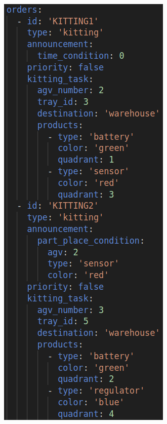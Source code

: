 \documentclass{uva-inf-article}
\begin{document}
\begin{figure}[h]
\includegraphics[scale=0.32]{images/rwa67_trial_3.png}

\end{figure}
\end{document}
